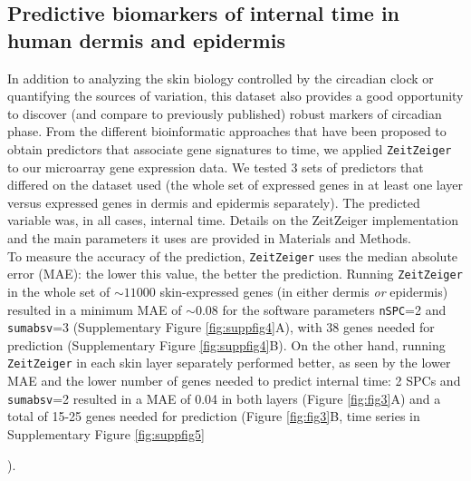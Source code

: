 {%

\subsection*{Predictive biomarkers of internal time in human dermis and epidermis}
In addition to analyzing the skin biology controlled by the circadian clock or quantifying the sources of variation, this dataset also provides a good opportunity to discover (and compare to previously published) robust markers of circadian phase. From the different bioinformatic approaches that have been proposed to obtain predictors that associate gene signatures to time, we applied \texttt{ZeitZeiger} \cite{Hughey2016} to our microarray gene expression data. We tested 3 sets of predictors that differed on the dataset used (the whole set of expressed genes in at least one layer versus expressed genes in dermis and epidermis separately). The predicted variable was, in all cases, internal time. Details on the ZeitZeiger implementation and the main parameters it uses are provided in Materials and Methods. \\

To measure the accuracy of the prediction, \texttt{ZeitZeiger} uses the median absolute error (MAE): the lower this value, the better the prediction. Running \texttt{ZeitZeiger} in the whole set of $\sim11000$ skin-expressed genes (in either dermis \textit{or} epidermis) resulted in a minimum MAE of $\sim0.08$ for the software parameters \texttt{nSPC}=2 and \texttt{sumabsv}=3 (Supplementary Figure \ref{fig:suppfig4}A), with 38 genes needed for prediction (Supplementary Figure \ref{fig:suppfig4}B). On the other hand, running \texttt{ZeitZeiger} in each skin layer separately performed better, as seen by the lower MAE and the lower number of genes needed to predict internal time: 2 SPCs and \texttt{sumabsv}=2 resulted in a MAE of 0.04 in both layers (Figure \ref{fig:fig3}A) and a total of 15-25 genes needed for prediction (Figure \ref{fig:fig3}B, time series in Supplementary Figure \ref{fig:suppfig5}}).\\ %

